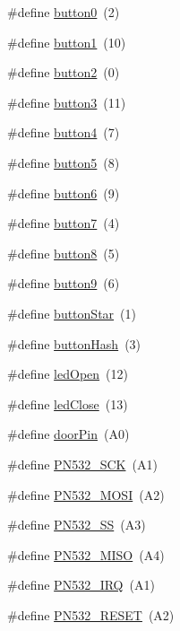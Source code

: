 \begin{DoxyCompactItemize}
\item 
\#define \hyperlink{TuerschlossNFC_8ino_af529492b16e6032ea7f490ca3acccafc}{button0}~(2)
\item 
\#define \hyperlink{TuerschlossNFC_8ino_a4f09c26739530bc1c83dc50f141d98d5}{button1}~(10)
\item 
\#define \hyperlink{TuerschlossNFC_8ino_a6e17106861cf47adf973f4db91e02f49}{button2}~(0)
\item 
\#define \hyperlink{TuerschlossNFC_8ino_a2f30da60792e16049aae62431ce5ae04}{button3}~(11)
\item 
\#define \hyperlink{TuerschlossNFC_8ino_ac7b90fb05639a7d1627a22976b8c6131}{button4}~(7)
\item 
\#define \hyperlink{TuerschlossNFC_8ino_ab7f1f088106bd227bd06e9294e381a61}{button5}~(8)
\item 
\#define \hyperlink{TuerschlossNFC_8ino_a7cf5ee3e168e2ffc2d01785767f23c85}{button6}~(9)
\item 
\#define \hyperlink{TuerschlossNFC_8ino_a25878b08a6c1a976d153ae010444032a}{button7}~(4)
\item 
\#define \hyperlink{TuerschlossNFC_8ino_a633b5c76a0df4a36f06fbe627080a57f}{button8}~(5)
\item 
\#define \hyperlink{TuerschlossNFC_8ino_ab83270eaa14655f4357bff54414987d3}{button9}~(6)
\item 
\#define \hyperlink{TuerschlossNFC_8ino_a5eab89f6902c757da5e895c3e73a7a03}{button\+Star}~(1)
\item 
\#define \hyperlink{TuerschlossNFC_8ino_ae7eb87c68f75c9a985196f520c8f374c}{button\+Hash}~(3)
\item 
\#define \hyperlink{TuerschlossNFC_8ino_a09e95790e05ebb12cd1669fc42d087a6}{led\+Open}~(12)
\item 
\#define \hyperlink{TuerschlossNFC_8ino_aa83f07fb722e1387ea802ee8733f43b7}{led\+Close}~(13)
\item 
\#define \hyperlink{TuerschlossNFC_8ino_a612d1fabdd304837022edda808c64ac0}{door\+Pin}~(A0)
\item 
\#define \hyperlink{TuerschlossNFC_8ino_a19c0d6db90035329695896e259b0da38}{P\+N532\+\_\+\+S\+CK}~(A1)
\item 
\#define \hyperlink{TuerschlossNFC_8ino_acaae8222f874e7ae5c75325213ccb54a}{P\+N532\+\_\+\+M\+O\+SI}~(A2)
\item 
\#define \hyperlink{TuerschlossNFC_8ino_a5fe7fdc589cffb666bd7ebf2a963ea63}{P\+N532\+\_\+\+SS}~(A3)
\item 
\#define \hyperlink{TuerschlossNFC_8ino_a7cc71e42d70cfd7298b007770c37ec60}{P\+N532\+\_\+\+M\+I\+SO}~(A4)
\item 
\#define \hyperlink{TuerschlossNFC_8ino_a04eeb1db4f8381537f1075bb5abd4b36}{P\+N532\+\_\+\+I\+RQ}~(A1)
\item 
\#define \hyperlink{TuerschlossNFC_8ino_a3f932648db5f69fee59502642fb26147}{P\+N532\+\_\+\+R\+E\+S\+ET}~(A2)
\end{DoxyCompactItemize}
